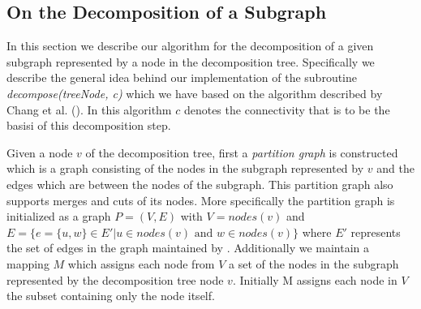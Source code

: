 \documentclass[a4paper,xcolor=dvipsnames, tikz, 12pt]{article}
\newcommand{\crep}{\text{C{\scriptsize REP}}}
\theoremstyle{definition}
\begin{document}
\begin{comment}
\begin{itemize}
	\item \cref{insertAndUpdate} calls the other routines as needed
	\item \cref{updateDecomposition} starts at the smallest subgraph containing the nodes a and b in the decomposition tree and computes a new decomposition of the subgraph. Specifically it uses the decomposition approach from \cite{Chang2013} to decompose one subgraph and then also computes the subgraphs with the next higher connectivity and recurses until the connectivity has reached alpha.
	\item updateMapping checks whether the alphaConnectedComponents were changed. If yes then it either collocates them if the resulting component is small enough or it adds the component to its return value. Then all the returned components are deleted, i.e. the edges connecting its nodes are deleted and the decomposition is recomputed
	\item this deletion is performed by \cref{delComponents}
\end{itemize}
\end{comment}

\subsection{On the Decomposition of a Subgraph}
\label{decomp_desc}
In this section we describe our algorithm for the decomposition of a given subgraph represented by a node in the decomposition tree. Specifically we describe the general idea behind our implementation of the subroutine \textit{decompose(treeNode, c)} which we have based on the algorithm described by Chang et al. (\cite{Chang2013}). In this algorithm $c$ denotes the connectivity that is to be the basisi of this decomposition step.

Given a node $v$ of the decomposition tree, first a \textit{partition graph} is constructed which is a graph consisting of the nodes in the subgraph represented by $v$ and the edges which are between the nodes of the subgraph. This partition graph also supports merges and cuts of its nodes. More specifically the partition graph is initialized as a graph $P=(V,E)$ with $V=nodes(v)$ and $E=\{e=\{u,w\}\in E'|u\in nodes(v)\text{ and }w\in nodes(v)\}$ where $E'$ represents the set of edges in the graph maintained by \crep{}. Additionally we maintain a mapping $M$ which assigns each node from $V$ a set of the nodes in the subgraph represented by the decomposition tree node $v$. Initially M assigns each node in $V$ the subset containing only the node itself.
\end{document}
